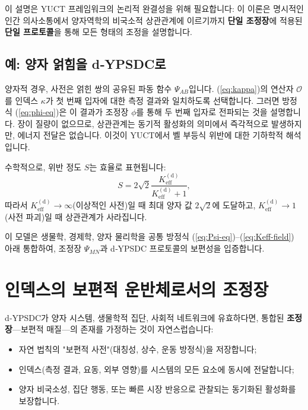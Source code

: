 \documentclass[11pt,a4paper]{article}
\newcommand{\Keff}{K_{\mathrm{eff}}}
\begin{document}
	이 설명은 YUCT 프레임워크의 논리적 완결성을 위해 필요합니다: 이 이론은 명시적인 인간 의사소통에서 양자역학의 비국소적 상관관계에 이르기까지 \textbf{단일 조정장}에 적용된 \textbf{단일 프로토콜}을 통해 모든 형태의 조정을 설명합니다.
	
	\subsection{예: 양자 얽힘을 d‑YPSDC로}
	
	양자적 경우, 사전은 얽힌 쌍의 공유된 파동 함수 \(\Psi_{AB}\)입니다. (\ref{eq:kappa})의 연산자 \(\mathcal{O}\)를 인덱스 \(\kappa\)가 첫 번째 입자에 대한 측정 결과와 일치하도록 선택합니다. 그러면 방정식 (\ref{eq:phi-eq})은 이 결과가 조정장 \(\phi\)를 통해 두 번째 입자로 전파되는 것을 설명합니다. 장이 질량이 없으므로, 상관관계는 동기적 활성화의 의미에서 즉각적으로 발생하지만, 에너지 전달은 없습니다. 이것이 YUCT에서 벨 부등식 위반에 대한 기하학적 해석입니다.
	
	수학적으로, 위반 정도 \(S\)는 효율로 표현됩니다:
	\begin{equation}
		S = 2\sqrt{2} \frac{\Keff^{\mathrm{(d)}}}{\Keff^{\mathrm{(d)}} + 1},
	\end{equation}
	따라서 \(\Keff^{\mathrm{(d)}} \to \infty\)(이상적인 사전)일 때 최대 양자 값 \(2\sqrt{2}\)에 도달하고, \(\Keff^{\mathrm{(d)}} \to 1\)(사전 파괴)일 때 상관관계가 사라집니다.
	
	이 모델은 생물학, 경제학, 양자 물리학을 공통 방정식 (\ref{eq:Psi-eq})–(\ref{eq:Keff-field}) 아래 통합하여, 조정장 \(\Psi_{MN}\)과 d‑YPSDC 프로토콜의 보편성을 입증합니다.
	
	\section{인덱스의 보편적 운반체로서의 조정장}
	
	d‑YPSDC가 양자 시스템, 생물학적 집단, 사회적 네트워크에 유효하다면, 통합된 \textbf{조정장}—보편적 매질—의 존재를 가정하는 것이 자연스럽습니다:
	
	\begin{itemize}
		\item 자연 법칙의 "보편적 사전"(대칭성, 상수, 운동 방정식)을 저장합니다;
		\item 인덱스(측정 결과, 요동, 외부 영향)를 시스템의 모든 요소에 동시에 전달합니다;
		\item 양자 비국소성, 집단 행동, 또는 빠른 시장 반응으로 관찰되는 동기화된 활성화를 보장합니다.
	\end{itemize}
	
\end{document}
